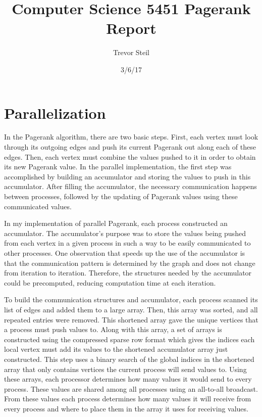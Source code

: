 \documentclass[a4paper]{article}
\title{Computer Science 5451 Pagerank Report }
\date{3/6/17}
\author{Trevor Steil}
\begin{document}
\maketitle

\section{Parallelization}

In the Pagerank algorithm, there are two basic steps. First, each vertex must look through its outgoing edges and push its current Pagerank out along
each of these edges. Then, each vertex must combine the values pushed to it in order to obtain its new Pagerank value. In the parallel implementation,
the first step was accomplished by building an accumulator and storing the values to push in this accumulator. After filling the accumulator, the
necessary communication happens between processes, followed by the updating of Pagerank values using these communicated values.

In my implementation of parallel Pagerank, each process constructed an accumulator. The accumulator's purpose was to store the values being pushed
from each vertex in a given process in such a way to be easily communicated to other processes. One observation that speeds up the use of the accumulator is that the communication pattern is determined by the
graph and does not change from iteration to iteration. Therefore, the structures needed by the accumulator could be precomputed, reducing computation
time at each iteration.

To build the communication structures and accumulator, each process scanned its list of edges and added them to a large array. Then, this array was
sorted, and all repeated entries were removed. This shortened array gave the unique vertices that a process must push values to. Along with this
array, a set of arrays is constructed using the compressed sparse row format which gives the indices each local vertex must add its values to the
shortened accumulator array just constructed. This step uses a binary search of the global indices in the shortened array that only contains vertices
the current process will send values to. Using these arrays,
each processor determines how many values it would send to every process. These values are shared among all processes using an all-to-all broadcast.
From these values each process determines how many values it will receive from every process and where to place them in the array it uses for
receiving values.
\end{document}

